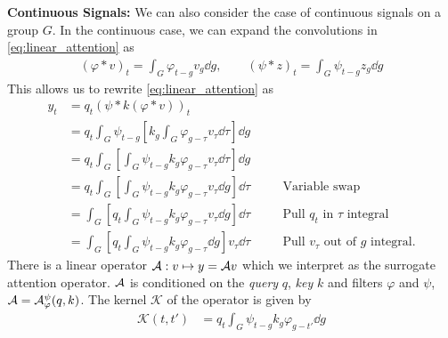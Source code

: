 \begin{tcolorbox} {\bf Continuous Signals:} 
    We can also consider the case of continuous signals on a group $G$. In the continuous case, we can expand the convolutions in \eqref{eq:linear_attention} as
    \begin{equation}\label{eq:linear_attention_convolution}
        \begin{aligned}
            (\varphi * v)_t = \int_G \varphi_{t-g} v_g \dd g,\qquad
            (\psi * z)_t = \int_G \psi_{t - g} z_g \dd g
        \end{aligned}
    \end{equation}
    This allows us to rewrite \eqref{eq:linear_attention} as
    \begin{equation}\label{eq:linear_attention_convolution2}
        \begin{aligned}
            y_t &= q_t(\psi * k(\varphi * v))_t \\
            &= q_t \int_G \psi_{t-g} \left[ k_g\int_G \varphi_{g - \tau} v_\tau \dd \tau \right] \dd g \\
            &= q_t \int_G \left[ \int_G \psi_{t-g} k_g \varphi_{g - \tau} v_\tau \dd \tau \right] \dd g\\
            &= q_t \int_G \left[ \int_G \psi_{t-g} k_g \varphi_{g - \tau} v_\tau \dd g \right] \dd \tau &&\quad\text{Variable swap}\\
            &= \int_G \left[ q_t \int_G \psi_{t-g} k_g \varphi_{g - \tau} v_\tau \dd g \right] \dd \tau &&\quad\text{Pull $q_t$ in $\tau $ integral}\\
            & = \int_G \left[ q_t \int_G \psi_{t-g} k_g \varphi_{g - \tau} \dd g \right] v_\tau \dd \tau &&\quad\text{Pull $v_\tau$ out of $g$ integral}.
        \end{aligned}
    \end{equation}
    There is a linear operator $\mathcal{A}: v \mapsto y=\mathcal{A} v$ which we interpret as the surrogate attention operator. $\mathcal{A}$ is conditioned on the \textit{query} $q$, \textit{key} $k$ and filters $\varphi$ and $\psi$, $\mathcal{A} = \mathcal{A}_{\varphi}^\psi(q,k)$. The kernel $\mathcal K$ of the operator is given by
    \begin{equation}
        \begin{aligned}
            \mathcal K(t,t') &= q_t\int_G \psi_{t-g} k_g \varphi_{g - t'} \dd g \\
        \end{aligned}
    \end{equation}
\end{tcolorbox}
%
